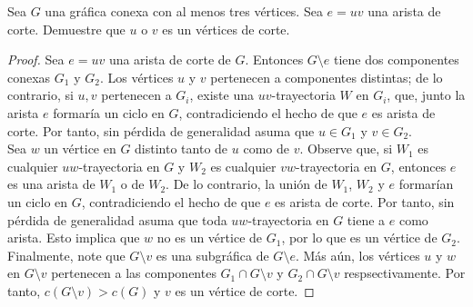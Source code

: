 \documentclass[12pt]{article}
\newenvironment{problem}[2][Problema]{\begin{trivlist}
\item[\hskip \labelsep {\bfseries #1}\hskip \labelsep {\bfseries #2.}]}{\end{trivlist}}
\begin{document}


\begin{problem}{5.1.2} Sea $G$ una gráfica conexa con al menos tres vértices. Sea $e = uv$ una arista de corte. Demuestre que $u$ o $v$ es un vértices de corte.
\end{problem}
\begin{proof}
Sea $e=uv$ una arista de corte de $G.$ Entonces $G\setminus e$ tiene dos componentes conexas $G_1$ y $G_2$. Los vértices $u$ y $v$ pertenecen a componentes distintas; de lo contrario, si $u,v$ pertenecen a $G_i$, existe una $uv$-trayectoria $W$ en $G_i$, que, junto la arista $e$ formaría un ciclo en $G$, contradiciendo el hecho de que $e$ es arista de corte. Por tanto, sin pérdida de generalidad asuma que $u\in G_1$ y $v\in G_2.$\\

Sea $w$ un vértice en $G$ distinto tanto de $u$ como de $v$. Observe que, si $W_1$ es cualquier $uw$-trayectoria en $G$ y $W_2$ es cualquier $vw$-trayectoria en $G$, entonces $e$ es una arista de $W_1$ o de $W_2$. De lo contrario, la unión de $W_1$, $W_2$ y $e$ formarían un ciclo en $G$, contradiciendo el hecho de que $e$ es arista de corte. Por tanto, sin pérdida de generalidad asuma que toda $uw$-trayectoria en $G$ tiene a $e$ como arista. Esto implica que $w$ no es un vértice de $G_1$, por lo que es un vértice de $G_2.$\\

Finalmente, note que $G \setminus v$ es una subgráfica de $G\setminus e$. Más aún, los vértices $u$ y $w$ en $G \setminus v$ pertenecen a las componentes $G_1 \cap G\setminus v$ y $G_2 \cap G \setminus v$ respsectivamente. Por tanto, $c(G \setminus v) > c(G)$ y $v$ es un vértice de corte.  
\end{proof}
\end{document}
